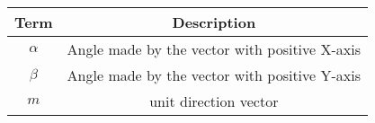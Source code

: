 \begin{tabular}[12ptx]{ |c| c|}
\hline\textbf{Term} & \textbf{Description}\\
\hline
$\alpha$&Angle made by the vector with positive X-axis \\
\hline
$\beta$&Angle made by the vector with positive Y-axis \\
\hline
$m$&unit direction vector\\
\hline
\end{tabular}